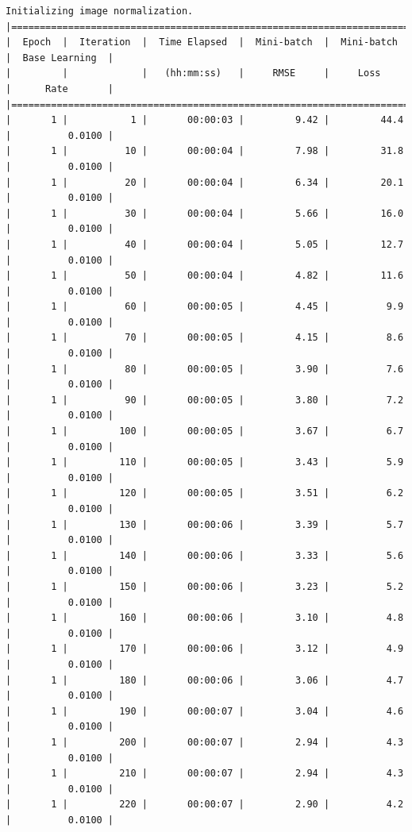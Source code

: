 \documentclass[11pt]{article}
\begin{document}
    \begin{Verbatim}[commandchars=\\\{\}]
Initializing image normalization.
|========================================================================================|
|  Epoch  |  Iteration  |  Time Elapsed  |  Mini-batch  |  Mini-batch  |  Base Learning  |
|         |             |   (hh:mm:ss)   |     RMSE     |     Loss     |      Rate       |
|========================================================================================|
|       1 |           1 |       00:00:03 |         9.42 |         44.4 |          0.0100 |
|       1 |          10 |       00:00:04 |         7.98 |         31.8 |          0.0100 |
|       1 |          20 |       00:00:04 |         6.34 |         20.1 |          0.0100 |
|       1 |          30 |       00:00:04 |         5.66 |         16.0 |          0.0100 |
|       1 |          40 |       00:00:04 |         5.05 |         12.7 |          0.0100 |
|       1 |          50 |       00:00:04 |         4.82 |         11.6 |          0.0100 |
|       1 |          60 |       00:00:05 |         4.45 |          9.9 |          0.0100 |
|       1 |          70 |       00:00:05 |         4.15 |          8.6 |          0.0100 |
|       1 |          80 |       00:00:05 |         3.90 |          7.6 |          0.0100 |
|       1 |          90 |       00:00:05 |         3.80 |          7.2 |          0.0100 |
|       1 |         100 |       00:00:05 |         3.67 |          6.7 |          0.0100 |
|       1 |         110 |       00:00:05 |         3.43 |          5.9 |          0.0100 |
|       1 |         120 |       00:00:05 |         3.51 |          6.2 |          0.0100 |
|       1 |         130 |       00:00:06 |         3.39 |          5.7 |          0.0100 |
|       1 |         140 |       00:00:06 |         3.33 |          5.6 |          0.0100 |
|       1 |         150 |       00:00:06 |         3.23 |          5.2 |          0.0100 |
|       1 |         160 |       00:00:06 |         3.10 |          4.8 |          0.0100 |
|       1 |         170 |       00:00:06 |         3.12 |          4.9 |          0.0100 |
|       1 |         180 |       00:00:06 |         3.06 |          4.7 |          0.0100 |
|       1 |         190 |       00:00:07 |         3.04 |          4.6 |          0.0100 |
|       1 |         200 |       00:00:07 |         2.94 |          4.3 |          0.0100 |
|       1 |         210 |       00:00:07 |         2.94 |          4.3 |          0.0100 |
|       1 |         220 |       00:00:07 |         2.90 |          4.2 |          0.0100 |

\end{Verbatim}
\end{document}
